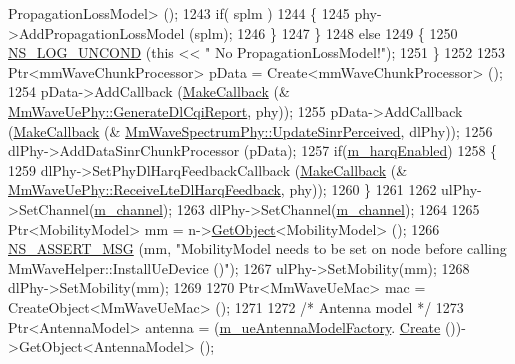 \begin{DoxyCode}
      PropagationLossModel> ();
1243                 \textcolor{keywordflow}{if}( splm )
1244                 \{
1245                         phy->AddPropagationLossModel (splm);
1246                 \}
1247         \}
1248         \textcolor{keywordflow}{else}
1249         \{
1250                 \hyperlink{log-macros-disabled_8h_a0b36e5e182b37194f85ef1c5e979fb2e}{NS\_LOG\_UNCOND} (\textcolor{keyword}{this} << \textcolor{stringliteral}{" No PropagationLossModel!"});
1251         \}
1252 
1253         Ptr<mmWaveChunkProcessor> pData = Create<mmWaveChunkProcessor> ();
1254         pData->AddCallback (\hyperlink{group__makecallbackmemptr_ga9376283685aa99d204048d6a4b7610a4}{MakeCallback} (&
      \hyperlink{classns3_1_1MmWaveUePhy_a94ad8ac60220078f5b5928018fb0e933}{MmWaveUePhy::GenerateDlCqiReport}, phy));
1255         pData->AddCallback (\hyperlink{group__makecallbackmemptr_ga9376283685aa99d204048d6a4b7610a4}{MakeCallback} (&
      \hyperlink{classns3_1_1MmWaveSpectrumPhy_ad00477c4185055c7fb2b717bb42fd668}{MmWaveSpectrumPhy::UpdateSinrPerceived}, dlPhy));
1256         dlPhy->AddDataSinrChunkProcessor (pData);
1257         \textcolor{keywordflow}{if}(\hyperlink{classns3_1_1MmWaveHelper_a56142ee76b853ab0fa13918aeb6800e9}{m\_harqEnabled})
1258         \{
1259                 dlPhy->SetPhyDlHarqFeedbackCallback (\hyperlink{group__makecallbackmemptr_ga9376283685aa99d204048d6a4b7610a4}{MakeCallback} (&
      \hyperlink{classns3_1_1MmWaveUePhy_ac00ac37c527f89a4e7a585cef8b95f4d}{MmWaveUePhy::ReceiveLteDlHarqFeedback}, phy));
1260         \}
1261 
1262         ulPhy->SetChannel(\hyperlink{classns3_1_1MmWaveHelper_adac6d83bc2acef8b7dbd9fc668207d95}{m\_channel});
1263         dlPhy->SetChannel(\hyperlink{classns3_1_1MmWaveHelper_adac6d83bc2acef8b7dbd9fc668207d95}{m\_channel});
1264 
1265         Ptr<MobilityModel> mm = n->\hyperlink{classns3_1_1Object_a13e18c00017096c8381eb651d5bd0783}{GetObject}<MobilityModel> ();
1266         \hyperlink{assert_8h_aff5ece9066c74e681e74999856f08539}{NS\_ASSERT\_MSG} (mm, \textcolor{stringliteral}{"MobilityModel needs to be set on node before calling
       MmWaveHelper::InstallUeDevice ()"});
1267         ulPhy->SetMobility(mm);
1268         dlPhy->SetMobility(mm);
1269 
1270         Ptr<MmWaveUeMac> mac = CreateObject<MmWaveUeMac> ();
1271 
1272         \textcolor{comment}{/* Antenna model */}
1273         Ptr<AntennaModel> antenna = (\hyperlink{classns3_1_1MmWaveHelper_a8b7460b8578a56bb15f191983959b3ac}{m\_ueAntennaModelFactory}.
      \hyperlink{classns3_1_1ObjectFactory_a18152e93f0a6fe184ed7300cb31e9896}{Create} ())->GetObject<AntennaModel> ();

\end{DoxyCode}
